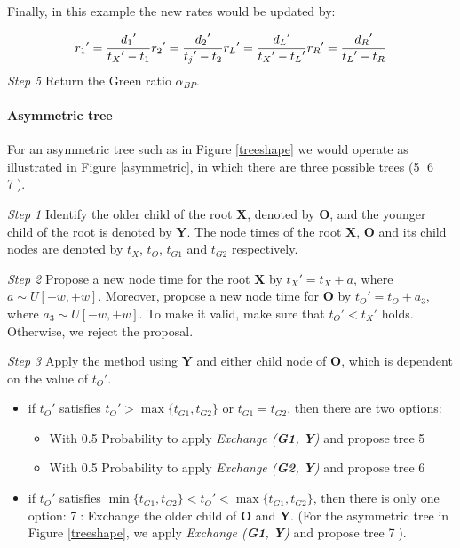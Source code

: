 \documentclass{bmcart}
\begin{document}
Finally, in this example the new rates would be updated by:

\begin{equation}\label{example1.2}
{r_1}' = \frac{{{d_1}'}}{{{t_X}' - {t_1}}} \\
{r_2}' = \frac{{{d_2}'}}{{{t_j}' - {t_2}}} \\
{r_L}' = \frac{{{d_L}'}}{{{t_X}' - {t_L}'}} \\
{r_R}' = \frac{{{d_R}'}}{{{t_L}' - {t_R}}}
\end{equation}
\emph{Step 5} Return the Green ratio ${\alpha_{BP}}$.
\paragraph*{Asymmetric tree}

For an asymmetric tree such as in Figure \ref{treeshape} we would operate as illustrated in Figure \ref{asymmetric}, in which there are three possible trees (\textcircled5 \textcircled6 \textcircled7).

\emph{Step 1} Identify the older child of the root \textbf{X}, denoted by \textbf{O}, and the younger child of the root is denoted by \textbf{Y}. The node times of the root \textbf{X},  \textbf{O} and its child nodes are denoted by ${t_X}$, ${t_O}$, ${t_{G1}}$ and ${t_{G2}}$ respectively.

\emph{Step 2} Propose a new node time for the root \textbf{X} by ${t_X}' = {t_X} + a$, where $a \sim U[ - w, + w]$. Moreover, propose a new node time for \textbf{O} by ${t_O}' = {t_O} + {a_3}$, where ${a_3} \sim U[ - w, + w]$. To make it valid, make sure that ${t_O}' < {t_X}'$ holds. Otherwise, we reject the proposal.

\emph{Step 3} Apply the method using \textbf{Y} and either child node of \textbf{O}, which is dependent on the value of ${t_O}'$.
\begin{itemize}
\item if ${t_O}'$ satisfies ${t_O}' > \max \{ {t_{G1}},{t_{G2}}\} $ or ${t_{G1}} = {t_{G2}}$, then there are two options:

  \begin{itemize}
    \item With 0.5 Probability to apply \textit{Exchange (\textbf{G1}, \textbf{Y})} and propose tree \textcircled5

    \item With 0.5 Probability to apply \textit{Exchange (\textbf{G2}, \textbf{Y})} and propose tree \textcircled6
  \end{itemize}
\item if ${t_O}'$ satisfies $\min \{ {t_{G1}},{t_{G2}}\}  < {t_O}' < \max \{ {t_{G1}},{t_{G2}}\} $, then there is only one option:
\textcircled7: Exchange the older child of \textbf{O} and \textbf{Y}.
 (For the asymmetric tree in Figure \ref{treeshape}, we apply \textit{Exchange (\textbf{G1}, \textbf{Y})} and propose tree \textcircled7).
\end{itemize}
\end{document}
